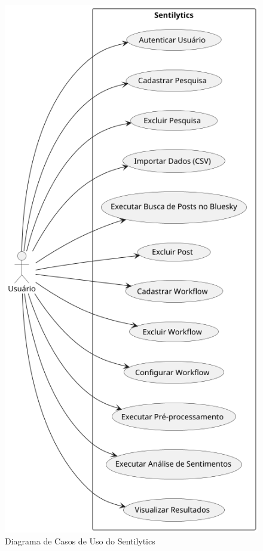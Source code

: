 \documentclass[
	12pt,				%
	oneside,			%
	a4paper,			%
	english,			%
	french,				%
	spanish,			%
	brazil				%
	]{abntex2}
\begin{document}
\begin{figure}[htbp]
\hypertarget{usecase}{%
\caption{Diagrama de Casos de Uso do Sentilytics}\label{usecase}
\begin{center}
\includegraphics[scale=0.3]{imagens/sentilytics/diagramas/usecase.png}
\end{center}
}
\end{figure}
\end{document}
